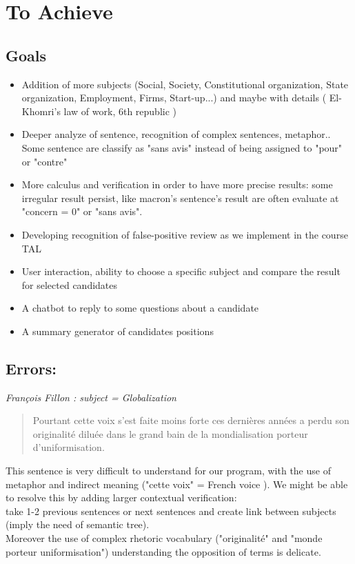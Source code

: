 \documentclass{article}
\begin{document}
\section{To Achieve}
\subsection{Goals }
\begin{itemize}
    \item Addition of more subjects (Social, Society, Constitutional organization, State organization, Employment, Firms, Start-up...) and maybe with details ( El-Khomri's law of work, 6th republic )
    \item Deeper analyze of sentence, recognition of complex sentences, metaphor..\\
    Some sentence are classify as "sans avis" instead of being assigned to "pour" or "contre"
    
    \item More calculus and verification in order to have more precise results: some irregular result persist, like macron's sentence's result are often evaluate at "concern =  0" or "sans avis".
    
    \item Developing recognition of false-positive review as we implement in the course TAL
    \item User interaction, ability to choose a specific subject and compare the result for selected candidates
    \item A chatbot to reply to some questions about a candidate
    \item A summary generator of candidates positions
    
\end{itemize}

\subsection{Errors: }

\emph{François Fillon : subject = Globalization}
\begin{quote}
Pourtant cette voix s’est faite moins forte ces dernières années a perdu son originalité diluée dans le grand bain de la mondialisation porteur d’uniformisation.
\end{quote}
This sentence is very difficult to understand for our program, with the use of metaphor and indirect meaning ("cette voix" = French voice ). We might be able to resolve this by adding larger contextual verification:\\
take 1-2 previous sentences or next sentences and create link between subjects (imply the need of semantic tree).\\
Moreover the use of complex rhetoric vocabulary ("originalité" and "monde porteur uniformisation") understanding the opposition of terms is delicate.
\end{document}
